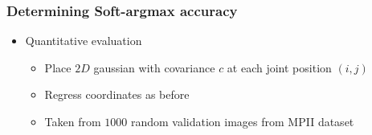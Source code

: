 \documentclass[9pt]{beamer}
\newenvironment{myframe}[1][]{%
\begin{frame}%
\frametitle{#1}
\setcounter{footnote}{0}


}{%
\end{frame}%
}
\begin{document}
\begin{myframe}[Determining Soft-argmax accuracy]
    \begin{itemize}
        \item Quantitative evaluation
        \begin{itemize}
            \item Place $2D$ gaussian with covariance $c$ at each joint position $(i,j)$
            \item Regress coordinates as before
            \item Taken from $1000$ random validation images from MPII dataset
        \end{itemize}
    \end{itemize}
    \begin{table}[]
        \centering
    \end{table}    
\end{myframe}
\end{document}
